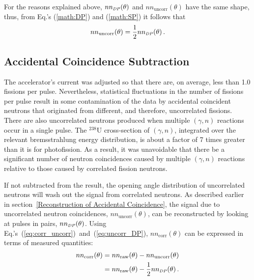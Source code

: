 For the reasons explained above, $nn_{\scaleto{DP}{4pt}}(\theta)$ and $nn_{\text{uncorr}}(\theta)$ have the same shape, thus, from Eq.'s (\ref{math:DP}) and (\ref{math:SP}) it follows that 
\begin{equation}
\label{eq:uncorr_DP}
nn_{\text{uncorr}}(\theta) = \frac{1}{2}nn_{\scaleto{DP}{4pt}}(\theta) \,.
\end{equation}

\subsection{Accidental Coincidence Subtraction}
\label{accidental subtraction}
The accelerator's current was adjusted so that there are, on average, less than 1.0 fissions per pulse.
Nevertheless, statistical fluctuations in the number of fissions per pulse result in some contamination of the data by accidental coincident neutrons that originated from different, and therefore, uncorrelated fissions.
There are also uncorrelated neutrons produced when multiple $(\gamma, n)$ reactions occur in a single pulse.
The $^{238}$U cross-section of $(\gamma, n)$, integrated over the relevant bremsstrahlung energy distribution, is about a factor of 7 times greater than it is for photofission.
As a result, it was unavoidable that there be a significant number of neutron coincidences caused by multiple $(\gamma, n)$ reactions relative to those caused by correlated fission neutrons.

If not subtracted from the result, the opening angle distribution of uncorrelated neutrons will wash out the signal from correlated neutrons. 
As described earlier in section~\ref{Reconstruction of Accidental Coincidence}, the signal due to uncorrelated neutron coincidences, $nn_{\text{uncorr}}(\theta)$, can be reconstructed by looking at pulses in pairs, $nn_{\scaleto{DP}{4pt}}(\theta)$.
Using Eq.'s~(\ref{eq:corr_uncorr})~and~(\ref{eq:uncorr_DP}),  $nn_{\text{corr}}(\theta)$ can be expressed in terms of measured quantities:
\begin{equation} \label{math:SP}
    \begin{split}
    nn_{\text{corr}}(\theta) &=  nn_{\text{raw}}(\theta) - nn_{\text{uncorr}}(\theta) \\
    &= nn_{\text{raw}}(\theta) - \frac{1}{2}nn_{\scaleto{DP}{4pt}}(\theta) \, .
    \end{split}
\end{equation}

